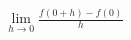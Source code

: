 \documentclass[preview]{standalone}
\begin{document}
\begin{align*}
\lim_{h\to 0} \frac{f(0+h)-f(0)}{h}
\end{align*}
\end{document}
